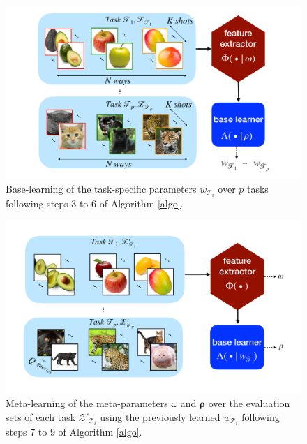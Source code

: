 \begin{figure}
  \centering
  \includegraphics[width=1\columnwidth]{BT.pdf}
  \vspace{-3mm}
  \caption{Base-learning of the task-specific parameters $w_{\mathcal{T}_i}$ over $p$ tasks following steps 3 to 6 of Algorithm \ref{algo}.}
  \label{fig:base}
\end{figure}
\begin{figure}
  \centering
  \includegraphics[width=1\columnwidth]{MT.pdf}
  \vspace{-3mm}
  \caption{Meta-learning of the meta-parameters $\omega$ and $\bm{\rho}$ over the evaluation sets of each task $\mathcal{Z}'_{\mathcal{T}_i}$ using the previously learned $w_{\mathcal{T}_i}$ following steps 7 to 9 of Algorithm \ref{algo}.}
  \label{fig:meta}
\end{figure}
\newpage
